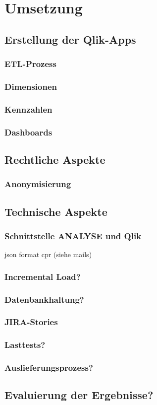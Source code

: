 \chapter{Umsetzung}
\label{umsetzung}
\minitoc\pagebreak
\lipsum[1-79]
\section{Erstellung der Qlik-Apps}
\subsection{ETL-Prozess}
\subsection{Dimensionen}
\subsection{Kennzahlen}
\subsection{Dashboards}

\section{Rechtliche Aspekte}
\subsection{Anonymisierung}

\section{Technische Aspekte}
\subsection{Schnittstelle ANALYSE und Qlik}
json format cpr (siehe mails)
\subsection{Incremental Load?}
\subsection{Datenbankhaltung?}
\subsection{JIRA-Stories}
\subsection{Lasttests?}
\subsection{Auslieferungsprozess?}

\section{Evaluierung der Ergebnisse?}
